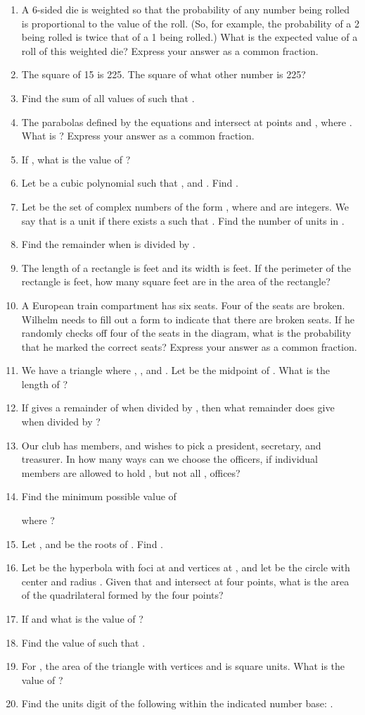 \documentclass{article}
\begin{document}
\begin{enumerate}
    \item A 6-sided die is weighted so that the probability of any number being rolled is proportional to the value of the roll. (So, for example, the probability of a 2 being rolled is twice that of a 1 being rolled.) What is the expected value of a roll of this weighted die? Express your answer as a common fraction.
    \item The square of 15 is 225. The square of what other number is 225?
    \item Find the sum of all values of  such that .
    \item The parabolas defined by the equations  and  intersect at points  and , where . What is ? Express your answer as a common fraction.
    \item If , what is the value of ?
    \item Let  be a cubic polynomial such that , and . Find .
    \item Let  be the set of complex numbers of the form , where  and  are integers. We say that  is a unit if there exists a  such that . Find the number of units in .
    \item Find the remainder when  is divided by .
    \item The length of a rectangle is  feet and its width is  feet. If the perimeter of the rectangle is  feet, how many square feet are in the area of the rectangle?
    \item  A European train compartment has six seats. Four of the seats are broken. Wilhelm needs to fill out a form to indicate that there are broken seats. If he randomly checks off four of the seats in the diagram, what is the probability that he marked the correct seats? Express your answer as a common fraction.
    \item We have a triangle  where , , and . Let  be the midpoint of . What is the length of ?
    \item If  gives a remainder of  when divided by , then what remainder does  give when divided by ?
    \item  Our club has  members, and wishes to pick a president, secretary, and treasurer. In how many ways can we choose the officers, if individual members are allowed to hold , but not all , offices?
    \item Find the minimum possible value of
    
    where ?
    \item Let , and  be the roots of . Find .
    \item Let  be the hyperbola with foci at  and vertices at , and let  be the circle with center  and radius . Given that  and  intersect at four points, what is the area of the quadrilateral formed by the four points?
    \item If  and  what is the value of ?
    \item Find the value of  such that .
    \item  For , the area of the triangle with vertices  and  is  square units. What is the value of ?
    \item Find the units digit of the following within the indicated number base: .


\end{enumerate}
\end{document}
